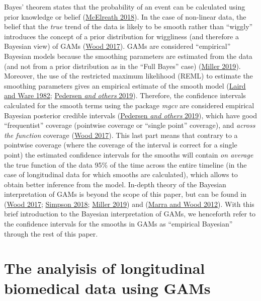\documentclass[
]{article}
\begin{document}
Bayes' theorem states that the probability of an event can be calculated using prior knowledge or belief (\protect\hyperlink{ref-mcelreath2018}{McElreath 2018}). In the case of non-linear data, the belief that the \emph{true} trend of the data is likely to be smooth rather than ``wiggly'' introduces the concept of a prior distribution for wiggliness (and therefore a Bayesian view) of GAMs (\protect\hyperlink{ref-wood2017}{Wood 2017}). GAMs are considered ``empirical'' Bayesian models because the smoothing parameters are estimated from the data (and not from a prior distribution as in the ``Full Bayes'' case) (\protect\hyperlink{ref-miller2019}{Miller 2019}). Moreover, the use of the restricted maximum likelihood (REML) to estimate the smoothing parameters gives an empirical estimate of the smooth model (\protect\hyperlink{ref-laird1982}{Laird and Ware 1982}; \protect\hyperlink{ref-pedersen2019}{Pedersen \emph{and others} 2019}). Therefore, the confidence intervals calculated for the smooth terms using the package \emph{mgcv} are considered empirical Bayesian posterior credible intervals (\protect\hyperlink{ref-pedersen2019}{Pedersen \emph{and others} 2019}), which have good ``frequentist'' coverage (pointwise coverage or ``single point'' coverage), and \emph{across the function} coverage (\protect\hyperlink{ref-wood2017}{Wood 2017}). This last part means that contrary to a pointwise coverage (where the coverage of the interval is correct for a single point) the estimated confidence intervals for the smooths will contain \emph{on average} the true function of the data 95\% of the time across the entire timeline (in the case of longitudinal data for which smooths are calculated), which allows to obtain better inference from the model. In-depth theory of the Bayesian interpretation of GAMs is beyond the scope of this paper, but can be found in (\protect\hyperlink{ref-wood2017}{Wood 2017}; \protect\hyperlink{ref-simpson2018}{Simpson 2018}; \protect\hyperlink{ref-miller2019}{Miller 2019}) and (\protect\hyperlink{ref-marra2012}{Marra and Wood 2012}). With this brief introduction to the Bayesian interpretation of GAMs, we henceforth refer to the confidence intervals for the smooths in GAMs as ``empirical Bayesian'' through the rest of this paper.

\hypertarget{longitudinal-GAMs}{%
\section{The analyisis of longitudinal biomedical data using GAMs}\label{longitudinal-GAMs}}
\end{document}
